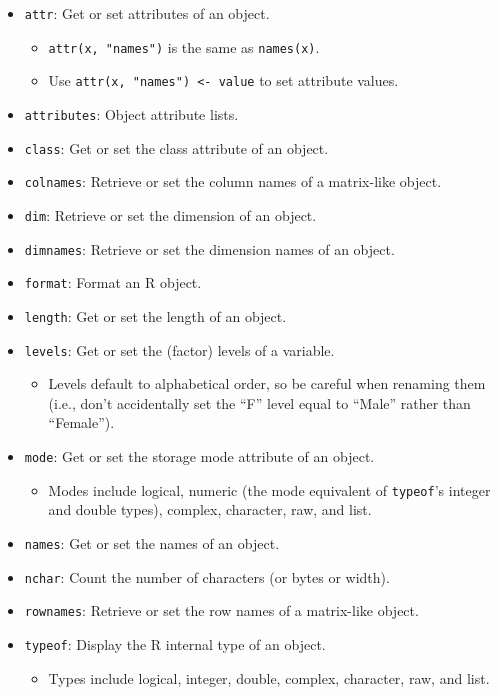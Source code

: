 \documentclass[]{book}
\providecommand{\tightlist}{%
  \setlength{\itemsep}{0pt}\setlength{\parskip}{0pt}}
\begin{document}
\begin{itemize}
\tightlist
\item
  \texttt{attr}: Get or set attributes of an object.

  \begin{itemize}
  \tightlist
  \item
    \texttt{attr(x,\ "names")} is the same as \texttt{names(x)}.
  \item
    Use \texttt{attr(x,\ "names")\ \textless{}-\ value} to set attribute values.
  \end{itemize}
\item
  \texttt{attributes}: Object attribute lists.
\item
  \texttt{class}: Get or set the class attribute of an object.
\item
  \texttt{colnames}: Retrieve or set the column names of a matrix-like object.
\item
  \texttt{dim}: Retrieve or set the dimension of an object.
\item
  \texttt{dimnames}: Retrieve or set the dimension names of an object.
\item
  \texttt{format}: Format an R object.
\item
  \texttt{length}: Get or set the length of an object.
\item
  \texttt{levels}: Get or set the (factor) levels of a variable.

  \begin{itemize}
  \tightlist
  \item
    Levels default to alphabetical order, so be careful when renaming them (i.e., don't accidentally set the ``F'' level equal to ``Male'' rather than ``Female'').
  \end{itemize}
\item
  \texttt{mode}: Get or set the storage mode attribute of an object.

  \begin{itemize}
  \tightlist
  \item
    Modes include logical, numeric (the mode equivalent of \texttt{typeof}'s integer and double types), complex, character, raw, and list.
  \end{itemize}
\item
  \texttt{names}: Get or set the names of an object.
\item
  \texttt{nchar}: Count the number of characters (or bytes or width).
\item
  \texttt{rownames}: Retrieve or set the row names of a matrix-like object.
\item
  \texttt{typeof}: Display the R internal type of an object.

  \begin{itemize}
  \tightlist
  \item
    Types include logical, integer, double, complex, character, raw, and list.
  \end{itemize}
\end{itemize}
\end{document}
